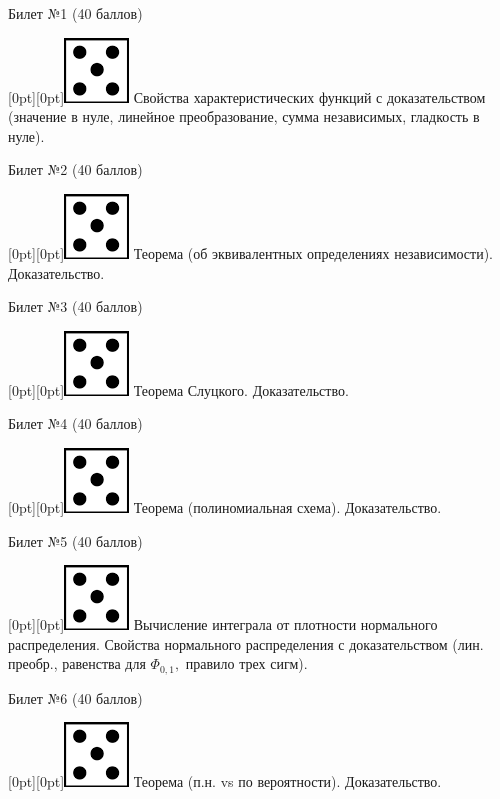 \documentclass[preview]{standalone}
\begin{document}
\begin{center} {\Large Билет №1 (40 баллов)} \end{center}
\raisebox{-1pt}[0pt][0pt]{\includegraphics[width=0.02\linewidth]{5.png}} Свойства характеристических функций с доказательством (значение в нуле, линейное преобразование, сумма независимых, гладкость в нуле). \\
\begin{center} {\Large Билет №2 (40 баллов)} \end{center}
\raisebox{-1pt}[0pt][0pt]{\includegraphics[width=0.02\linewidth]{5.png}} Теорема (об эквивалентных определениях независимости). Доказательство. \\
\begin{center} {\Large Билет №3 (40 баллов)} \end{center}
\raisebox{-1pt}[0pt][0pt]{\includegraphics[width=0.02\linewidth]{5.png}} Теорема Слуцкого. Доказательство. \\
\begin{center} {\Large Билет №4 (40 баллов)} \end{center}
\raisebox{-1pt}[0pt][0pt]{\includegraphics[width=0.02\linewidth]{5.png}} Теорема (полиномиальная схема). Доказательство. \\
\begin{center} {\Large Билет №5 (40 баллов)} \end{center}
\raisebox{-1pt}[0pt][0pt]{\includegraphics[width=0.02\linewidth]{5.png}} Вычисление интеграла от плотности нормального распределения.  Свойства нормального распределения с доказательством (лин. преобр., равенства для $\Phi_{0,1},$ правило трех сигм). \\
\begin{center} {\Large Билет №6 (40 баллов)} \end{center}
\raisebox{-1pt}[0pt][0pt]{\includegraphics[width=0.02\linewidth]{5.png}} Теорема (п.н. vs по вероятности). Доказательство. \\
\end{document}
